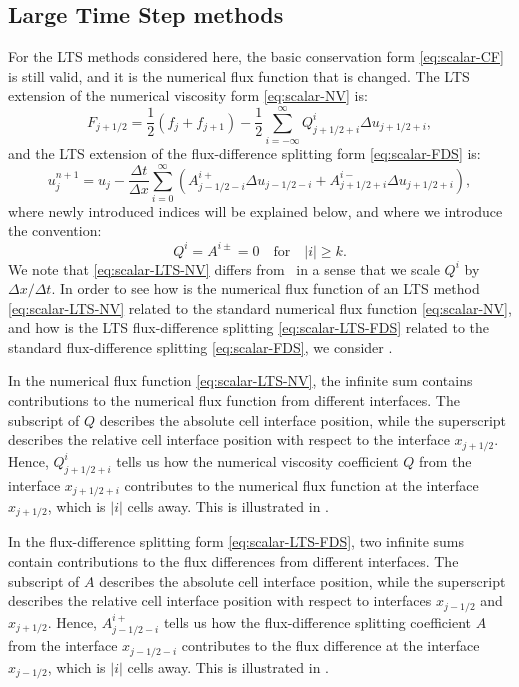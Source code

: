 \subsection{Large Time Step methods}
\label{sec:Background:scalar-LTS-methods}

For the LTS methods considered here, the basic conservation form \eqref{eq:scalar-CF} is still valid, and it is the numerical flux function that is changed. The LTS extension of the numerical viscosity form \eqref{eq:scalar-NV} is:
\begin{equation} \label{eq:scalar-LTS-NV}
F_{j+1/2} = \frac{1}{2} \left( f_j + f_{j+1} \right) - \frac{1}{2} \sum\limits_{i=-\infty}^{\infty} Q_{j+1/2+i}^i \Delta u_{j+1/2+i},
\end{equation}
and the LTS extension of the flux-difference splitting form \eqref{eq:scalar-FDS} is:
\begin{equation} \label{eq:scalar-LTS-FDS}
u_j^{n+1} = u_j - \frac{\Delta t}{\Delta x} \sum_{i=0}^{\infty} \left( A_{j-1/2-i}^{i+} \Delta u_{j-1/2-i} + A_{j+1/2+i}^{i-} \Delta u_{j+1/2+i} \right),
\end{equation}
where newly introduced indices will be explained below, and where we introduce the convention:
\begin{equation}
Q^{i} = A^{i \pm} = 0 \quad \text{for} \quad |i| \geq k.
\end{equation}
We note that \eqref{eq:scalar-LTS-NV} differs from~\cite{lin16} in a sense that we scale $ Q^i $ by $ \Delta x / \Delta t $. In order to see how is the numerical flux function of an LTS method \eqref{eq:scalar-LTS-NV} related to the standard numerical flux function \eqref{eq:scalar-NV}, and how is the LTS flux-difference splitting \eqref{eq:scalar-LTS-FDS} related to the standard flux-difference splitting \eqref{eq:scalar-FDS}, we consider .

In the numerical flux function \eqref{eq:scalar-LTS-NV}, the infinite sum contains contributions to the numerical flux function from different interfaces. The subscript of $ Q $ describes the absolute cell interface position, while the superscript describes the relative cell interface position with respect to the interface $ x_{j+1/2} $. Hence, $ Q_{j+1/2+i}^i $ tells us how the numerical viscosity coefficient $ Q $ from the interface $ x_{j+1/2+i} $ contributes to the numerical flux function at the interface $ x_{j+1/2} $, which is $ |i| $ cells away. This is illustrated in .

In the flux-difference splitting form \eqref{eq:scalar-LTS-FDS}, two infinite sums contain contributions to the flux differences from different interfaces. The subscript of $ A $ describes the absolute cell interface position, while the superscript describes the relative cell interface position with respect to interfaces $ x_{j-1/2} $ and $ x_{j+1/2} $. Hence, $ A_{j-1/2-i}^{i+} $ tells us how the flux-difference splitting coefficient $ A $ from the interface $ x_{j-1/2-i} $ contributes to the flux difference at the interface $ x_{j-1/2} $, which is $ |i| $ cells away. This is illustrated in .

